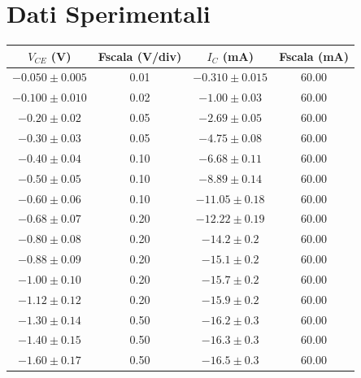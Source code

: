 \documentclass[a4paper,11pt]{article}
\begin{document}
\section{Dati Sperimentali}
\begin{table}[h!]
  \begin{center}
    \begin{tabular}{c|c|c|c}
      \textbf{$V_{CE}$ (V)} & \textbf{Fscala (V/div)} & \textbf{$I_{C}$ (mA)} & \textbf{Fscala (mA)} \\
      \hline
      $ -0.050 \pm 0.005 $  & 0.01                    & $ -0.310 \pm 0.015 $  & 60.00                \\
      $ -0.100 \pm 0.010 $  & 0.02                    & $ -1.00 \pm 0.03 $    & 60.00                \\
      $ -0.20 \pm 0.02 $    & 0.05                    & $ -2.69 \pm 0.05 $    & 60.00                \\
      $ -0.30 \pm 0.03 $    & 0.05                    & $ -4.75 \pm 0.08 $    & 60.00                \\
      $ -0.40 \pm 0.04 $    & 0.10                    & $ -6.68 \pm 0.11 $    & 60.00                \\
      $ -0.50 \pm 0.05 $    & 0.10                    & $ -8.89 \pm 0.14 $    & 60.00                \\
      $ -0.60 \pm 0.06 $    & 0.10                    & $ -11.05 \pm 0.18 $   & 60.00                \\
      $ -0.68 \pm 0.07 $    & 0.20                    & $ -12.22 \pm 0.19 $   & 60.00                \\
      $ -0.80 \pm 0.08 $    & 0.20                    & $ -14.2 \pm 0.2 $     & 60.00                \\
      $ -0.88 \pm 0.09 $    & 0.20                    & $ -15.1 \pm 0.2 $     & 60.00                \\
      $ -1.00 \pm 0.10 $    & 0.20                    & $ -15.7 \pm 0.2 $     & 60.00                \\
      $ -1.12 \pm 0.12 $    & 0.20                    & $ -15.9 \pm 0.2 $     & 60.00                \\
      $ -1.30 \pm 0.14 $    & 0.50                    & $ -16.2 \pm 0.3 $     & 60.00                \\
      $ -1.40 \pm 0.15 $    & 0.50                    & $ -16.3 \pm 0.3 $     & 60.00                \\
      $ -1.60 \pm 0.17 $    & 0.50                    & $ -16.5 \pm 0.3 $     & 60.00                \\

\end{tabular}
\end{center}
\end{table}
\end{document}

